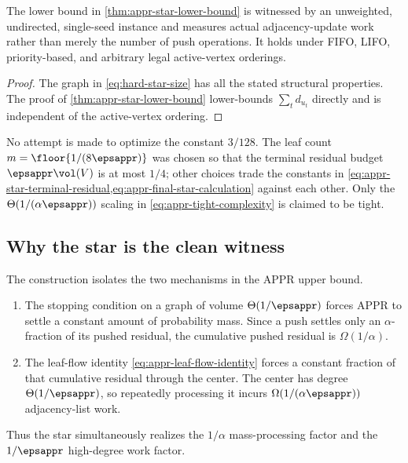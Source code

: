 \begin{corollary}
\label{cor:appr-hard-instance-properties}
The lower bound in \cref{thm:appr-star-lower-bound} is witnessed by an
unweighted, undirected, single-seed instance and measures actual
adjacency-update work rather than merely the number of push operations. It
holds under FIFO, LIFO, priority-based, and arbitrary legal active-vertex
orderings.
\end{corollary}

\begin{proof}
The graph in \cref{eq:hard-star-size} has all the stated structural
properties. The proof of \cref{thm:appr-star-lower-bound} lower-bounds
\(\sum_td_{u_t}\) directly and is independent of the active-vertex ordering.
\end{proof}

\begin{remark}[Constants]
\label{rem:appr-constants}
No attempt is made to optimize the constant \(3/128\). The leaf count
\(m=\floor{1/(8\epsappr)}\) was chosen so that the terminal residual budget
\(\epsappr\vol(V)\) is at most \(1/4\); other choices trade the constants in
\cref{eq:appr-star-terminal-residual,eq:appr-final-star-calculation} against
each other. Only the \(\Theta(1/(\alpha\epsappr))\) scaling in
\cref{eq:appr-tight-complexity} is claimed to be tight.
\end{remark}

\subsection{Why the star is the clean witness}
\label{subsec:appr-star-discussion}

The construction isolates the two mechanisms in the APPR upper bound.
\begin{enumerate}[leftmargin=*]
    \item The stopping condition on a graph of volume
    \(\Theta(1/\epsappr)\) forces APPR to settle a constant amount of
    probability mass. Since a push settles only an \(\alpha\)-fraction of its
    pushed residual, the cumulative pushed residual is \(\Omega(1/\alpha)\).
    \item The leaf-flow identity \cref{eq:appr-leaf-flow-identity} forces a
    constant fraction of that cumulative residual through the center. The
    center has degree \(\Theta(1/\epsappr)\), so repeatedly processing it
    incurs \(\Omega(1/(\alpha\epsappr))\) adjacency-list work.
\end{enumerate}
Thus the star simultaneously realizes the \(1/\alpha\) mass-processing factor
and the \(1/\epsappr\) high-degree work factor.

